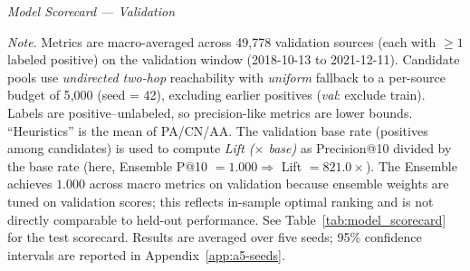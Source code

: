 \begin{table}[H]
\centering
\caption[\textit{Model Scorecard}]{\textit{Model Scorecard --- Validation}}
\label{tab:model-scorecard-validation}

\resizebox{\linewidth}{!}{}

  \captionsetup{justification=raggedright,singlelinecheck=false}
  \caption*{\footnotesize \textit{Note}. {Metrics are macro-averaged across 49{,}778 validation sources (each with $\geq 1$ labeled positive) on the validation window (2018-10-13 to 2021-12-11). Candidate pools use \emph{undirected two-hop} reachability with \emph{uniform} fallback to a per-source budget of 5{,}000 (seed = 42), excluding earlier positives (\textit{val}: exclude train). Labels are positive--unlabeled, so precision-like metrics are lower bounds. ``Heuristics'' is the mean of PA/CN/AA. The validation base rate (positives among candidates) is used to compute \emph{Lift ($\times$ base)} as Precision@10 divided by the base rate (here, Ensemble P@10 $= 1.000 \Rightarrow$ Lift $= 821.0\times$). The Ensemble achieves $1.000$ across macro metrics on validation because ensemble weights are tuned on validation scores; this reflects in-sample optimal ranking and is not directly comparable to held-out performance. See Table~\ref{tab:model_scorecard} for the test scorecard. Results are averaged over five seeds; 95\% confidence intervals are reported in Appendix~\ref{app:a5-seeds}.}
}
\end{table}

